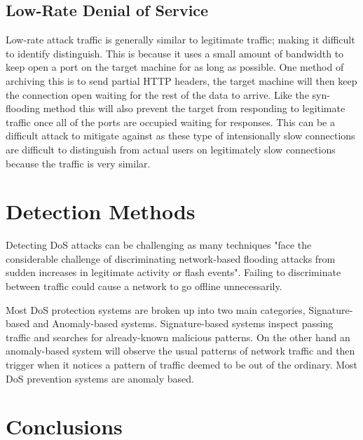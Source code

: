 \documentclass[conference, a4paper]{IEEEtran}
\begin{document}
\subsection{Low-Rate Denial of Service}
    Low-rate attack traffic is generally similar to legitimate traffic; making it difficult to identify distinguish.\cite{two_layer_approach__DDOS}
    This is because it uses a small amount of bandwidth to keep open a port on the target machine for as long as possible.
    One method of archiving this is to send partial HTTP headers, the target machine will then keep the connection open waiting for the rest of the data to arrive.
    Like the syn-flooding method this will also prevent the target from responding to legitimate traffic once all of the ports are occupied waiting for responses.
    This can be a difficult attack to mitigate against as these type of intensionally slow connections are difficult to distinguish from actual users on legitimately slow connections because the traffic is very similar.\cite{cloudflare_low_rate}

\section{Detection Methods}
    Detecting DoS attacks can be challenging as many techniques "face the considerable challenge of discriminating network-based flooding attacks from sudden increases in legitimate activity or flash events".\cite{detection_methods_2006}
    Failing to discriminate between traffic could cause a network to go offline unnecessarily.

    Most DoS protection systems are broken up into two main categories, Signature-based and Anomaly-based systems.
    Signature-based systems inspect passing traffic and searches for already-known malicious patterns.
    On the other hand an anomaly-based system will observe the usual patterns of network traffic and then trigger when it notices a pattern of traffic deemed to be out of the ordinary.
    Most DoS prevention systems are anomaly based.\cite{chnage_point_monitoring}
\section{Conclusions}
\end{document}
